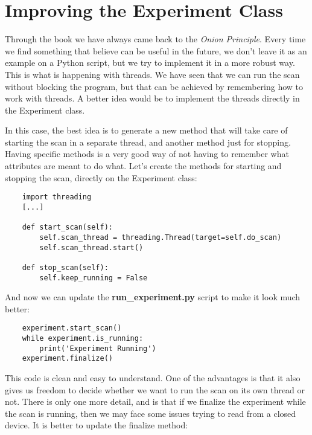 
\section{Improving the Experiment Class}\label{section:improving-experiment}
Through the book we have always came back to the \emph{Onion Principle}. Every time we find something that believe can be useful in the future, we don't leave it as an example on a Python script, but we try to implement it in a more robust way. This is what is happening with threads. We have seen that we can run the scan without blocking the program, but that can be achieved by remembering how to work with threads. A better idea would be to implement the threads directly in the Experiment class.

In this case, the best idea is to generate a new method that will take care of starting the scan in a separate thread, and another method just for stopping. Having specific methods is a very good way of not having to remember what attributes are meant to do what. Let's create the methods for starting and stopping the scan, directly on the Experiment class:

\begin{verbatim}
    import threading
    [...]

    def start_scan(self):
        self.scan_thread = threading.Thread(target=self.do_scan)
        self.scan_thread.start()

    def stop_scan(self):
        self.keep_running = False
\end{verbatim}

And now we can update the \textbf{run\_experiment.py} script to make it look much better:

\begin{verbatim}
    experiment.start_scan()
    while experiment.is_running:
        print('Experiment Running')
    experiment.finalize()
\end{verbatim}

This code is clean and easy to understand. One of the advantages is that it also gives us freedom to decide whether we want to run the scan on its own thread or not. There is only one more detail, and is that if we finalize the experiment while the scan is running, then we may face some issues trying to read from a closed device. It is better to update the finalize method:

